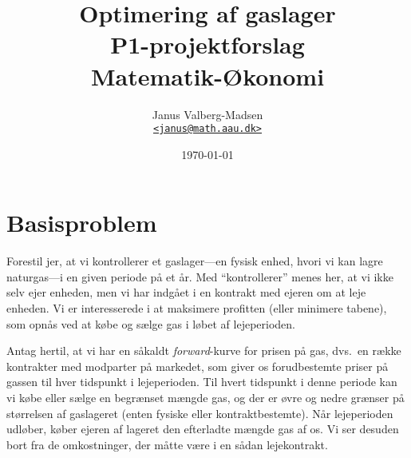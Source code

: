 \documentclass[12pt,oneside,final]{article}
\title{%
  Optimering af gaslager\\
  \large P1-projektforslag \\
  Matematik-{\O}konomi
}
\author{
  Janus Valberg-Madsen\\
  \href{mailto:janus@math.aau.dk}{\texttt{<janus@math.aau.dk>}}
}
\date{\today}
\newcommand{\1}{\mathbbm{1}}
\begin{document}
\maketitle

\begin{center}
\end{center}

\tableofcontents

\clearpage
\section{Basisproblem}

Forestil jer, at vi kontrollerer et gaslager---en fysisk enhed, hvori vi kan lagre naturgas---i en given periode på et år.
Med ``kontrollerer'' menes her, at vi ikke selv ejer enheden, men vi har indgået i en kontrakt med ejeren om at leje enheden.
Vi er interesserede i at maksimere profitten (eller minimere tabene), som opnås ved at købe og sælge gas i løbet af lejeperioden.

Antag hertil, at vi har en såkaldt \emph{forward}-kurve for prisen på gas, dvs.\ en række kontrakter med modparter på markedet, som giver os forudbestemte priser på gassen til hver tidspunkt i lejeperioden.
Til hvert tidspunkt i denne periode kan vi købe eller sælge en begrænset mængde gas, og der er øvre og nedre grænser på størrelsen af gaslageret (enten fysiske eller kontraktbestemte).
Når lejeperioden udløber, køber ejeren af lageret den efterladte mængde gas af os.
Vi ser desuden bort fra de omkostninger, der måtte være i en sådan lejekontrakt.
\end{document}

